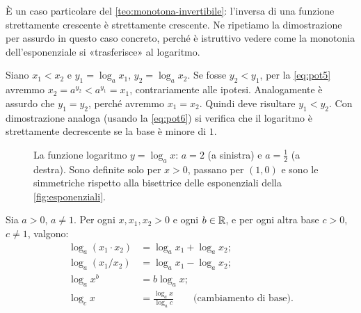 \begin{strategia}
È un caso particolare del \cref{teo:monotona-invertibile}: l'inversa di una funzione
strettamente crescente è strettamente crescente. Ne ripetiamo la dimostrazione per
assurdo in questo caso concreto, perché è istruttivo vedere come la monotonia
dell'esponenziale si «trasferisce» al logaritmo.
\end{strategia}

\begin{dimostrazione}
Siano $x_{1}<x_{2}$ e $y_{1}=\log_{a}x_{1}$, $y_{2}=\log_{a}x_{2}$. Se fosse
$y_{2}<y_{1}$, per la \eqref{eq:pot5} avremmo $x_{2}=a^{y_{2}}<a^{y_{1}}=x_{1}$,
contrariamente alle ipotesi. Analogamente è assurdo che $y_{1}=y_{2}$, perché avremmo
$x_{1}=x_{2}$. Quindi deve risultare $y_{1}<y_{2}$. Con dimostrazione analoga (usando
la \eqref{eq:pot6}) si verifica che il logaritmo è strettamente decrescente se la base è
minore di $1$.
\end{dimostrazione}

\begin{figure}[htb]
\centering
{}\hfill
{}
\caption{La funzione logaritmo $y=\log_{a}x$: $a=2$ (a sinistra) e $a=\tfrac12$ (a
destra). Sono definite solo per $x>0$, passano per $(1,0)$ e sono le simmetriche
rispetto alla bisettrice delle esponenziali della \cref{fig:esponenziali}.}
\label{fig:logaritmi}
\end{figure}

\begin{proposizione}\label{prop:log-proprieta}
Sia $a>0$, $a\neq1$. Per ogni $x,x_{1},x_{2}>0$ e ogni $b\in\mathbb{R}$, e per ogni altra base
$c>0$, $c\neq1$, valgono:
\begin{align}
  \log_{a}(x_{1}\cdot x_{2}) &= \log_{a}x_{1}+\log_{a}x_{2}; \label{eq:log1}\\
  \log_{a}(x_{1}/x_{2})      &= \log_{a}x_{1}-\log_{a}x_{2}; \label{eq:log2}\\
  \log_{a}x^{b}              &= b\log_{a}x; \label{eq:log3}\\
  \log_{c}x                  &= \frac{\log_{a}x}{\log_{a}c} \qquad\text{(cambiamento di base).} \label{eq:log4}
\end{align}
\end{proposizione}


